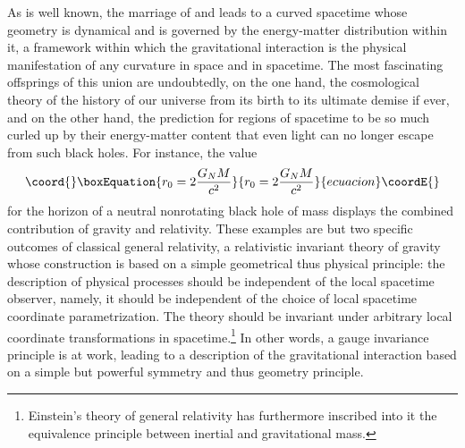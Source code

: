 \documentclass[a4paper,11pt]{article}
\begin{document}
As is well known, the marriage of \coordHE{} and \coordHE{} leads to a curved
spacetime whose geometry is dynamical and is governed by the energy-matter
distribution within it, a framework within which the gravitational 
interaction is the physical manifestation of any curvature in space and 
in spacetime. The most fascinating offsprings of this union are undoubtedly,
on the one hand, the cosmological theory of the history of our universe from 
its birth to its ultimate demise if ever, and on the other hand,
the prediction for regions of spacetime to be so much curled up by their
energy-matter content that even light can no longer escape from such
black holes. For instance, the value
\begin{equation}\coord{}\boxEquation{
r_0=2\frac{G_NM}{c^2}
}{
r_0=2\frac{G_NM}{c^2}
}{ecuacion}\coordE{}\end{equation}
for the horizon of a neutral nonrotating black hole of mass \coordHE{}
displays the combined contribution of gravity and relativity.
These examples are but two specific outcomes of classical general relativity,
a relativistic invariant theory of gravity whose construction is based
on a simple geometrical thus physical principle: the description
of physical processes should be independent of the local spacetime
observer, namely, it should be independent of the choice
of local spacetime coordinate parametrization. The theory should be
invariant under arbitrary local coordinate transformations in
spacetime.\footnote{Einstein's theory of general relativity has furthermore 
inscribed into it the equivalence principle between inertial and 
gravitational mass.}
In other words, a gauge invariance principle is at work, leading
to a description of the gravitational interaction based on
a simple but powerful symmetry and thus geometry principle.
\end{document}
